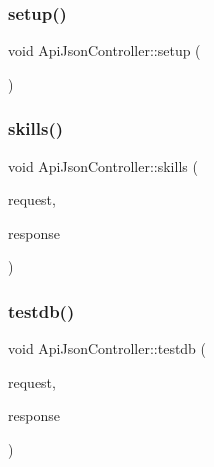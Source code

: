 \mbox{\label{classApiJsonController_a1e809af244d7c98b3033e573919921b2}} 
\subsubsection{\texorpdfstring{setup()}{setup()}}
{\footnotesize\ttfamily void Api\+Json\+Controller\+::setup (\begin{DoxyParamCaption}{ }\end{DoxyParamCaption})\hspace{0.3cm}{\ttfamily [virtual]}}

\mbox{\label{classApiJsonController_a2d2a0b94bcf49ece8444ef3b30a61189}} 
\subsubsection{\texorpdfstring{skills()}{skills()}}
{\footnotesize\ttfamily void Api\+Json\+Controller\+::skills (\begin{DoxyParamCaption}\item[{Mongoose\+::\+Request \&}]{request,  }\item[{Mongoose\+::\+Json\+Response \&}]{response }\end{DoxyParamCaption})}

\mbox{\label{classApiJsonController_a51551fd5eb0a87f79f810d67353584cb}} 
\subsubsection{\texorpdfstring{testdb()}{testdb()}}
{\footnotesize\ttfamily void Api\+Json\+Controller\+::testdb (\begin{DoxyParamCaption}\item[{Mongoose\+::\+Request \&}]{request,  }\item[{Mongoose\+::\+Json\+Response \&}]{response }\end{DoxyParamCaption})}

